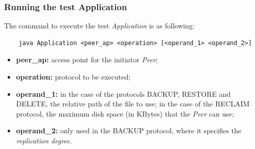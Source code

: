 \documentclass[a4paper]{article}
\begin{document}
\subsubsection{Running the test Application}
The command to execute the test \textit{Application} is as following:
\begin{lstlisting}
    java Application <peer_ap> <operation> [<operand_1> <operand_2>]
\end{lstlisting}
\begin{itemize}
    \item \textbf{peer\_ap:} access point for the initiator \textit{Peer};
    \item \textbf{operation:} protocol to be executed;
    \item \textbf{operand\_1:} in the case of the protocols BACKUP, RESTORE and DELETE, the 
    relative path of the file to use; in the case of the RECLAIM protocol, the maximum disk space
    (in KBytes) that the \textit{Peer} can use;
    \item \textbf{operand\_2:} only used in the BACKUP protocol, where it specifies the 
    \textit{replication degree}.
\end{itemize}
\end{document}

